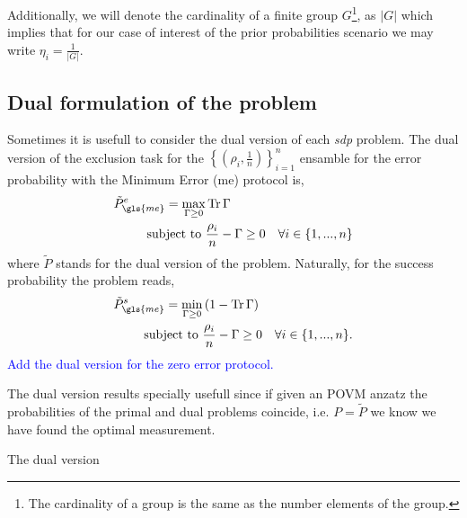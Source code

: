 \documentclass[12pt,letterpaper]{article}
\DeclareMathOperator{\tr}{Tr}
\begin{document}
\begin{multicols}{2}
Additionally, we will denote the cardinality of a finite group $G$\footnote{The cardinality of a group is the same as the number elements of the group.}, as $|G|$ which implies that for our case of interest of the prior probabilities scenario we may write $\eta_i=\frac{1}{|G|}$.

\subsection{Dual formulation of the problem}
Sometimes it is usefull to consider the dual version of each \emph{sdp} problem. The dual version of the exclusion task for the $\left\{\left(\rho_i,\frac{1}{n}\right)\right\}_{i=1}^n$ ensamble for the error probability with the Minimum Error (\gls{me}) protocol is,
\begin{align*}
	\tilde{P}_{\gls{me}}^e=\max_{\Gamma\geq0}&\tr{\Gamma}\\
	\text{subject to }&\frac{\rho_i}{n}-\Gamma\geq 0\quad\forall i\in\{1,...,n\}
\end{align*}
where $\tilde{P}$ stands for the dual version of the problem. Naturally, for the success probability the problem reads,
\begin{align*}
	\tilde{P}_{\gls{me}}^s=\min_{\Gamma\geq0}&\left(1-\tr{\Gamma}\right)\\
	\text{subject to }&\frac{\rho_i}{n}-\Gamma\geq 0\quad\forall i\in\{1,...,n\}.
\end{align*}
\textcolor{blue}{Add the dual version for the zero error protocol.}

The dual version results specially usefull since if given an POVM anzatz the probabilities of the primal and dual problems coincide, i.e. $P=\tilde P$ we know we have found the optimal measurement. 

The dual version 

\end{multicols}
\end{document}
